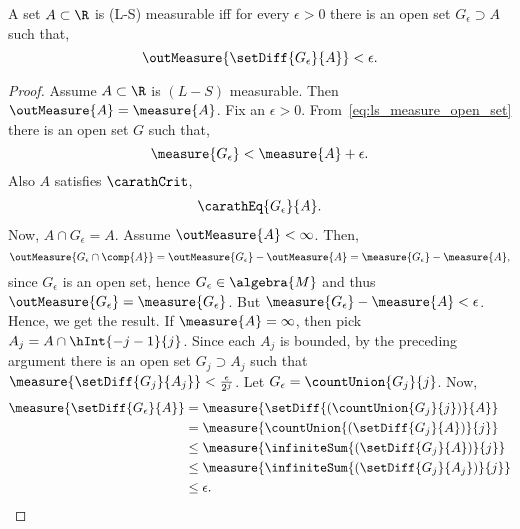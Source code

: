 \begin{Theorem}[name=Equivalent criteria for (L-S) measurablity]\label{thm:equiv_crit_LS_meas}
    A set $A \subset \R$ is (L-S) measurable iff for every $\epsilon > 0$ there is an open set
    $G_{\epsilon}\supset A$ such that,
    \[\outMeasure{\setDiff{G_{\epsilon}}{A}} < \epsilon.\]
\end{Theorem}
\begin{proof}
    Assume $A \subset \R$ is $(L-S)$ measurable. Then $\outMeasure{A} = \measure{A}$.
    Fix an $\epsilon > 0$. From~\ref{eq:ls_measure_open_set} there is an open set $G$ such that,
    \[\measure{G_{\epsilon}} < \measure{A} + \epsilon.\] Also $A$ satisfies $\carathCrit$,
    \begin{align*}
	\carathEq{G_{\epsilon}}{A}.
    \end{align*}
    Now, $A\cap G_{\epsilon} = A$. Assume $\outMeasure{A} < \infty$. Then,
    \[\outMeasure{G_{\epsilon}\cap\comp{A}} = \outMeasure{G_{\epsilon}} - \outMeasure{A} = 
	\measure{G_{\epsilon}} - \measure{A},\]
    since $G_{\epsilon}$ is an open set, hence $G_{\epsilon} \in \algebra{M}$ and thus 
    $\outMeasure{G_{\epsilon}} = \measure{G_{\epsilon}}$. But
    $\measure{G_{\epsilon}} - \measure{A} < \epsilon$. Hence, we get the result.
    If $\measure{A} = \infty$, then pick $A_j = A \cap \hInt{-j-1}{j}$. Since each $A_j$ is bounded,
    by the preceding argument there is an open set $G_j \supset A_j$ such that 
    $\measure{\setDiff{G_j}{A_j}} < \frac{\epsilon}{2^j}$. Let $G_{\epsilon} = \countUnion{G_j}{j}$.
    Now,
    \begin{align*}
	\measure{\setDiff{G_{\epsilon}}{A}} &= \measure{\setDiff{(\countUnion{G_j}{j})}{A}} \\
	& = \measure{\countUnion{(\setDiff{G_j}{A})}{j}} \\
	& \leq \measure{\infiniteSum{(\setDiff{G_j}{A})}{j}} \\
	& \leq \measure{\infiniteSum{(\setDiff{G_j}{A_j})}{j}} \\
	& \leq \epsilon.
    \end{align*}


\end{proof}
